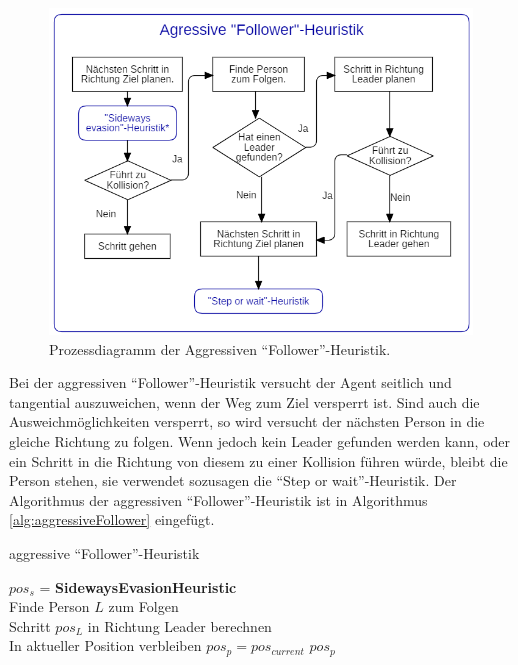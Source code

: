 \begin{figure}[H]
	\centering
		\includegraphics[width=1.0\textwidth]{pictures/model/algorithm/heuristics/aggressive_follower_heuristic.png}
	\caption{Prozessdiagramm der Aggressiven "`Follower"'-Heuristik.}
	\label{fig:AFH}
\end{figure}
Bei der aggressiven "`Follower"'-Heuristik versucht der Agent seitlich und tangential auszuweichen, wenn der Weg zum Ziel versperrt ist. Sind auch die Ausweichmöglichkeiten versperrt, so wird versucht der nächsten Person in die gleiche Richtung zu folgen. Wenn jedoch kein Leader gefunden werden kann, oder ein Schritt in die Richtung von diesem zu einer Kollision führen würde, bleibt die Person stehen, sie verwendet sozusagen die "`Step or wait"'-Heuristik. Der Algorithmus der aggressiven "`Follower"'-Heuristik ist in Algorithmus \ref{alg:aggressiveFollower} eingefügt.

\begin{algorithm} [H]
	\caption{aggressive "`Follower"'-Heuristik}
	\label{alg:aggressiveFollower}
	
	\AggressiveFollowerHeuristic{} {
		$pos_s$ = \textbf{SidewaysEvasionHeuristic}\\
		 {
			Finde Person $L$ zum Folgen \\
			 { 
				Schritt $pos_L$ in Richtung Leader berechnen \\
				 {
					In aktueller Position verbleiben $pos_p = pos_{current}$ 
				} 
			} 
		} 
		\Return $pos_p$
	}
\end{algorithm}


